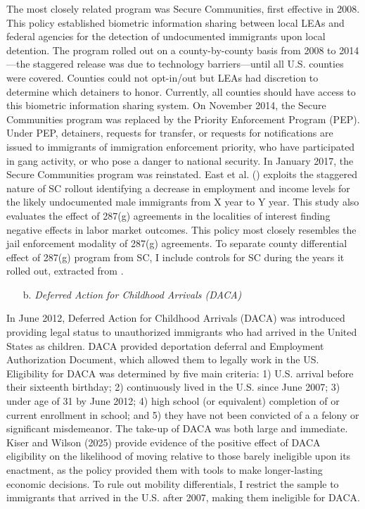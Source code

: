 \documentclass{article}
\begin{document}
The most closely related program was Secure Communities, first effective in 2008. This policy established biometric information sharing between local LEAs and federal agencies for the detection of undocumented immigrants upon local detention. The program rolled out on a county-by-county basis from 2008 to 2014—the staggered release was due to technology barriers—until all U.S. counties were covered. Counties could not opt-in/out but LEAs had discretion to determine which detainers to honor. Currently, all counties should have access to this biometric information sharing system. On November 2014, the Secure Communities program was replaced by the Priority Enforcement Program (PEP). Under PEP, detainers, requests for transfer, or requests for notifications are issued to immigrants of immigration enforcement priority, who have participated in gang activity, or who pose a danger to national security. In January 2017, the Secure Communities program was reinstated. East et al. (\citeyear{east2023}) exploits the staggered nature of SC rollout identifying a decrease in employment and income levels for the likely undocumented male immigrants from X year to Y year. This study also evaluates the effect of 287(g) agreements in the localities of interest finding negative effects in labor market outcomes. This policy most closely resembles the jail enforcement modality of 287(g) agreements. To separate county differential effect of 287(g) program from SC, I include controls for SC during the years it rolled out, extracted from \cite{east2023}.


\begin{itemize}
    \item[b.] \textit{Deferred Action for Childhood Arrivals (DACA)}
\end{itemize}

In June 2012, Deferred Action for Childhood Arrivals (DACA) was introduced providing legal status to unauthorized immigrants who had arrived in the United States as children. DACA provided deportation deferral and Employment Authorization Document, which allowed them to legally work in the US. Eligibility for DACA was determined by five main criteria:  1) U.S. arrival before their sixteenth birthday; 2) continuously lived in the U.S. since June 2007; 3) under age of 31 by June 2012; 4) high school (or equivalent) completion of or current enrollment in school; and 5) they have not been convicted of a a felony or significant misdemeanor. The take-up of DACA was both large and immediate. Kiser and Wilson (2025) provide evidence of the positive effect of DACA eligibility on the likelihood of moving relative to those barely ineligible upon its enactment, as the policy provided them with tools to make longer-lasting economic decisions. To rule out mobility differentials, I restrict the sample to immigrants that arrived in the U.S. after 2007, making them ineligible for DACA.
\end{document}
